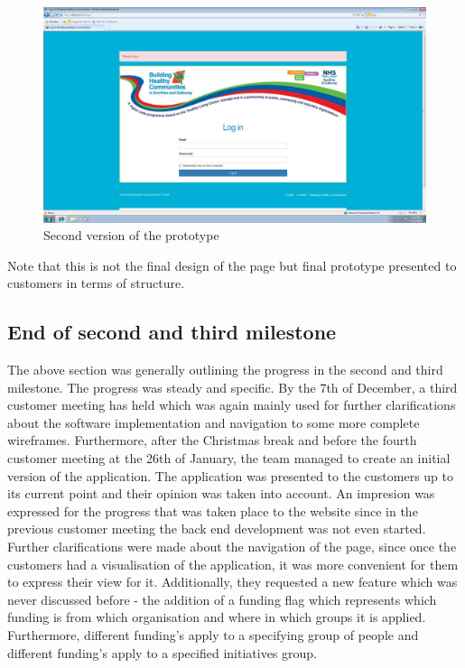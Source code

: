\documentclass{l3proj}
\begin{document}
\begin{figure}[ht]
\centerline{\includegraphics[width=\textwidth, height=\textheight, keepaspectratio]{newhome.png}}
\caption{Second version of the prototype}
\label{fig:newhome}
\end{figure}

Note that this is not the final design of the page but final prototype presented to customers in terms of structure.

\subsection{End of second and third milestone}
\label{sec:milestone23}

The above section was generally outlining the progress in the second and third milestone. The progress was steady and specific. By the 7th of December, a third customer meeting has held which was again mainly used for further clarifications about the software implementation and navigation to some more complete wireframes. Furthermore, after the Christmas break and before the fourth customer meeting at the 26th of January, the team managed to create an initial version of the application. The application was presented to the customers up to its current point and their opinion was taken into account. An impresion was expressed for the progress that was taken place to the website since in the previous customer meeting the back end development was not even started. Further clarifications were made about the navigation of the page, since once the customers had a visualisation of the application, it was more convenient for them to express their view for it. Additionally, they requested a new feature which was never discussed before - the addition of a funding flag which represents which funding is from which organisation and where in which groups it is applied. Furthermore, different funding's apply to a specifying group of people and different funding's apply to a specified initiatives group.
\end{document}

